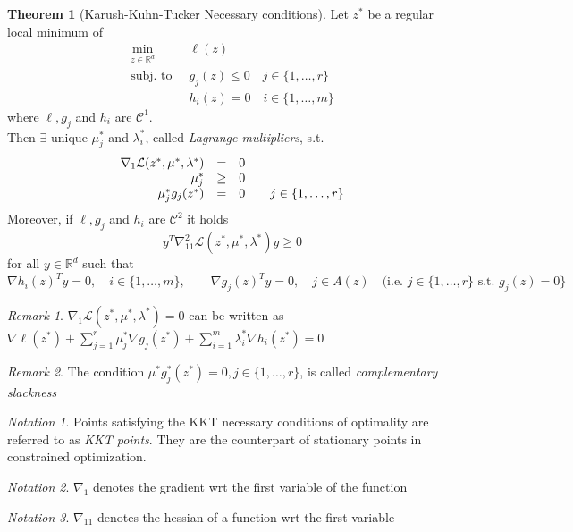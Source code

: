 \documentclass[openany]{book}
\newcommand{\R}{\mathbb{R}}               %
\theoremstyle{definition}
\newtheorem{theorem}{Theorem}[section]
\theoremstyle{remark}
\newtheorem*{remark}{Remark}
\newtheorem*{notation}{Notation}
\begin{document}
\begin{theorem}[Karush-Kuhn-Tucker Necessary conditions]
    Let $z^*$ be a regular local minimum of 
    \begin{align*}
        \min_{z\in\R^d}\  &\ell(z) \\
        \text{subj. to }\  & g_j(z)\leq 0 \quad j\in\{1,\dots,r\}\\
        & h_i(z)=0 \quad i\in\{1,\dots,m\}
    \end{align*}
    where $\ell,g_j$ and $h_i$ are $\mathcal{C}^1$. \\
    Then $\exists$ unique $\mu_j^*$ and $\lambda_i^*$, called \emph{Lagrange multipliers}, s.t.
    \[
        \begin{array}{ r c l}
            \nabla_1\mathcal{L}(z^*,\mu^*,\lambda^*) & = & 0 \\             \mu_j^* & \geq & 0 \\
            \mu^*_jg_j(z^*) & = & 0 \qquad j\in \{1,\dots,r\} 
        \end{array}
    \]
    Moreover, if $\ell, g_j$ and $h_i$ are $\mathcal{C}^2$ it holds
    \[
        y^T\nabla_{11}^2\mathcal{L}(z^*,\mu^*,\lambda^*)y \geq 0
    \]
    for all $y\in\R^d$ such that
    \[
    \nabla h_i(z)^Ty = 0, \quad i\in\{1,\dots,m\}, \qquad \nabla g_j(z)^Ty = 0, \quad j\in A(z) \quad \text{(i.e. } j\in\{1,\dots,r\} \text{ s.t. } g_j(z)=0\}
\]
\end{theorem}
\begin{remark}
    $\nabla_1\mathcal{L}(z^*,\mu^*,\lambda^*) = 0$ can be written as 
    $\nabla\ell(z^*)+\displaystyle\sum_{j=1}^{r}\mu_j^*\nabla g_j(z^*)+\displaystyle\sum_{i=1}^{m}\lambda_i^*\nabla h_i(z^*)=0$
\end{remark}
\begin{remark}
    The condition $\mu^*g_j^*(z^*)=0,j\in\{1,\dots,r\}$, is called \emph{complementary slackness}
\end{remark}
\begin{notation}
    Points satisfying the KKT necessary conditions of optimality are referred to as \emph{KKT points}. They are the counterpart of stationary points in constrained optimization.
\end{notation}
\begin{notation}
    $\nabla_1$ denotes the gradient wrt the first variable of the function
\end{notation}
\begin{notation}
    $\nabla_{11}$ denotes the hessian of a function wrt the first variable
\end{notation}
\end{document}
